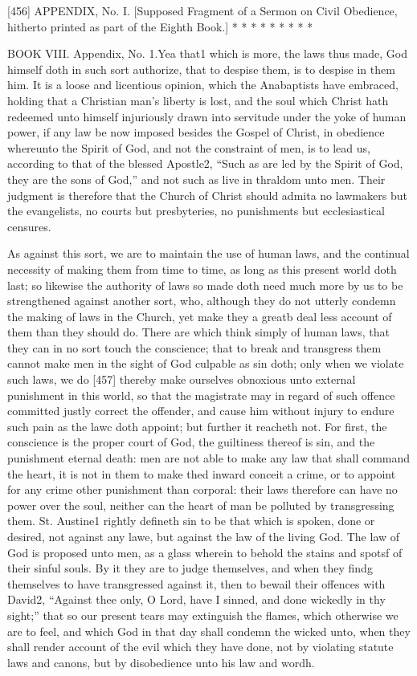 
[456]
APPENDIX, No. I. 
[Supposed Fragment of a Sermon on Civil Obedience, hitherto printed as part of the Eighth Book.]
* * * * * * * * *

BOOK VIII. Appendix, No. 1.Yea that1 which is more, the laws thus made, God himself doth in such sort authorize, that to despise them, is to despise in them him. It is a loose and licentious opinion, which the Anabaptists have embraced, holding that a Christian man’s liberty is lost, and the soul which Christ hath redeemed unto himself injuriously drawn into servitude under the yoke of human power, if any law be now imposed besides the Gospel of Christ, in obedience whereunto the Spirit of God, and not the constraint of men, is to lead us, according to that of the blessed Apostle2, “Such as are led by the Spirit of God, they are the sons of God,” and not such as live in thraldom unto men. Their judgment is therefore that the Church of Christ should admita no lawmakers but the evangelists, no courts but presbyteries, no punishments but ecclesiastical censures.

As against this sort, we are to maintain the use of human laws, and the continual necessity of making them from time to time, as long as this present world doth last; so likewise the authority of laws so made doth need much more by us to be strengthened against another sort, who, although they do not utterly condemn the making of laws in the Church, yet make they a greatb deal less account of them than they should do. There are which think simply of human laws, that they can in no sort touch the conscience; that to break and transgress them cannot make men in the sight of God culpable as sin doth; only when we violate such laws, we do [457] thereby make ourselves obnoxious unto external punishment in this world, so that the magistrate may in regard of such offence committed justly correct the offender, and cause him without injury to endure such pain as the lawc doth appoint; but further it reacheth not. For first, the conscience is the proper court of God, the guiltiness thereof is sin, and the punishment eternal death: men are not able to make any law that shall command the heart, it is not in them to make thed inward conceit a crime, or to appoint for any crime other punishment than corporal: their laws therefore can have no power over the soul, neither can the heart of man be polluted by transgressing them. St. Austine1 rightly defineth sin to be that which is spoken, done or desired, not against any lawe, but against the law of the living God. The law of God is proposed unto men, as a glass wherein to behold the stains and spotsf of their sinful souls. By it they are to judge themselves, and when they findg themselves to have transgressed against it, then to bewail their offences with David2, “Against thee only, O Lord, have I sinned, and done wickedly in thy sight;” that so our present tears may extinguish the flames, which otherwise we are to feel, and which God in that day shall condemn the wicked unto, when they shall render account of the evil which they have done, not by violating statute laws and canons, but by disobedience unto his law and wordh.


